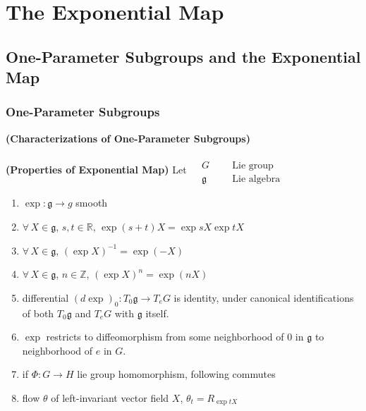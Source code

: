 \section{The Exponential Map}
\subsection{One-Parameter Subgroups and the Exponential Map}

\subsubsection{One-Parameter Subgroups}

\begin{theorem}[20.1]\textbf{(Characterizations of One-Parameter Subgroups)}
\end{theorem}


\begin{proposition}[20.8] \textbf{(Properties of Exponential Map)} Let $\begin{aligned} & \quad \\ 
    & G \quad \, & \text{ Lie group } \\
    & \mathfrak{g} \quad \, & \text{ Lie algebra } \end{aligned}$

\begin{enumerate}
\item[(a)] $\exp: \mathfrak{g} \to g$ smooth
\item[(b)] $\forall \, X \in \mathfrak{g}$, $s,t\in \mathbb{R}$, $\exp{(s+t)}X = \exp{sX}\exp{tX}$
\item[(c)] $\forall \, X \in \mathfrak{g}$, $(\exp{X})^{-1} = \exp{(-X)}$
\item[(d)] $\forall \, X \in \mathfrak{g}$, $n\in \mathbb{Z}$, $(\exp{X})^n = \exp{(nX)}$
\item[(e)] differential $(d\exp)_0:T_0\mathfrak{g} \to T_eG$ is identity, under canonical identifications of both $T_0\mathfrak{g}$ and $T_eG$ with $\mathfrak{g}$ itself.
\item[(f)] $\exp$ restricts to diffeomorphism from some neighborhood of $0$ in $\mathfrak{g}$ to neighborhood of $e$ in $G$.  
\item[(g)] if $\Phi:G\to H$ lie group homomorphism, following commutes




\item[(h)] flow $\theta$ of left-invariant vector field $X$, $\theta_t = R_{\exp{tX}}$
\end{enumerate}
\end{proposition}

